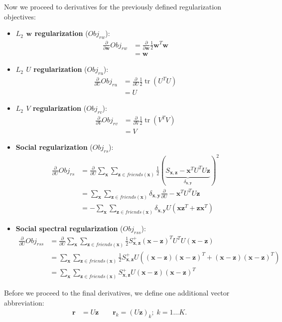\documentclass{sig-alternate}
\newcommand{\Obj}{\mathit{Obj}}
\newcommand{\ru}{\mathit{ru}}
\newcommand{\rv}{\mathit{rv}}
\newcommand{\rw}{\mathit{rw}}
\newcommand{\rs}{\mathit{rs}}
\newcommand{\rss}{\mathit{rss}}
\newcommand{\tr}{\operatorname{tr}}
\newcommand{\x}{\vec{x}}
\newcommand{\y}{\vec{y}}
\newcommand{\z}{\vec{z}}
\newcommand{\w}{\vec{w}}
\renewcommand{\r}{\vec{r}}
\renewcommand{\vec}[1]{\mathbf{#1}}
\begin{document}
Now we proceed to derivatives for the previously defined
regularization objectives:
\begin{itemize}
\item {\bf $L_2$ $\w$ regularization} ($\Obj_\rw$):
\begin{align*}
\frac{\partial}{\partial \w} \Obj_\rw & = \frac{\partial}{\partial \w} \frac{1}{2} \w^T \w\\
& = \w
\end{align*}
\item {\bf $L_2$ $U$ regularization} ($\Obj_\ru$):
\begin{align*}
\frac{\partial}{\partial U} \Obj_\ru & = \frac{\partial}{\partial U} \frac{1}{2} \tr(U^T U) \\
& = U
\end{align*}
\item {\bf $L_2$ $V$ regularization} ($\Obj_\rv$):
\begin{align*}
\frac{\partial}{\partial V} \Obj_\rv & = \frac{\partial}{\partial V} \frac{1}{2} \tr(V^T V) \\
& = V
\end{align*}
\item {\bf Social regularization} ($\Obj_\rs$):
\begin{align*}
\frac{\partial}{\partial U} \Obj_\rs & = \frac{\partial}{\partial U} \sum_{\x} \sum_{\z \in \mathit{friends}(\x)} \frac{1}{2} \left( \underbrace{S_{\x,\z} - \x^T U^T U \z}_{\delta_{\x,\y}} \right)^2 \\
& = \sum_{\x} \sum_{\z \in \mathit{friends}(\x)} \delta_{\x,\y} \frac{\partial}{\partial U} - \x^T U^T U \z \\
& = - \sum_{\x} \sum_{\z \in \mathit{friends}(\x)} \delta_{\x,\y} U (\x \z^T + \z \x^T)
\end{align*}
\item {\bf Social spectral regularization} ($\Obj_\rss$):
\begin{align*}
\frac{\partial}{\partial U} \Obj_\rss & = \frac{\partial}{\partial U} \sum_{\x} \sum_{\z \in \mathit{friends}(\x)} \frac{1}{2} S^+_{\x,\z} (\x - \z)^T U^T U (\x - \z) \\
& = \sum_{\x} \sum_{\z \in \mathit{friends}(\x)} \frac{1}{2} S^+_{\x,\z} U ((\x - \z)(\x - \z)^T + (\x - \z)(\x - \z)^T)\\
& = \sum_{\x} \sum_{\z \in \mathit{friends}(\x)} S^+_{\x,\z} U (\x - \z)(\x - \z)^T
\end{align*}
\end{itemize}

Before we proceed to the final derivatives, we define one additional
vector abbreviation: 
\begin{align*}
\r & = U \z \qquad \r_{k} = (U \z)_{k}; \; k=1\ldots K .
\end{align*}
\end{document}
